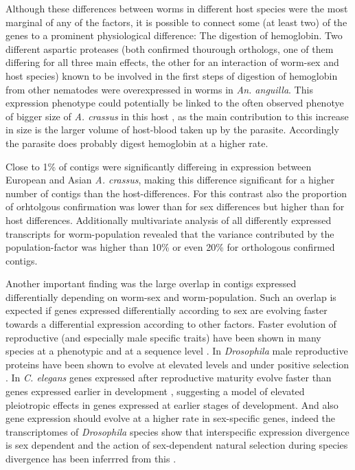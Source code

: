 Although these differences between worms in different host species
were the most marginal of any of the factors, it is possible to
connect some (at least two) of the genes to a prominent physiological
difference: The digestion of hemoglobin. Two different aspartic
proteases (both confirmed thourough orthologs, one of them differing
for all three main effects, the other for an interaction of worm-sex
and host species) known to be involved in the first steps of digestion
of hemoglobin from other nematodes \cite{pmid12782060} were
overexpressed in worms in \textit{An. anguilla}. This expression
phenotype could potentially be linked to the often observed phenotye
of bigger size of \textit{A. crassus} in this host
\cite{knopf_swimbladder_2006}, as the main contribution to this
increase in size is the larger volume of host-blood taken up by the
parasite. Accordingly the parasite does probably digest hemoglobin at
a higher rate.

Close to 1\% of contigs were significantly differeing in expression
between European and Asian \textit{A. crassus}, making this difference
significant for a higher number of contigs than the
host-differences. For this contrast also the proportion of orhtolgous
confirmation was lower than for sex differences but higher than for
host differences. Additionally multivariate analysis of all
differently expressed transcripts for worm-population revealed that
the variance contributed by the population-factor was higher than 10\%
or even 20\% for orthologous confirmed contigs.

Another important finding was the large overlap in contigs expressed
differentially depending on worm-sex and worm-population. Such an
overlap is expected if genes expressed differentially according to sex
are evolving faster towards a differential expression according to
other factors. Faster evolution of reproductive (and especially male
specific traits) have been shown in many species at a phenotypic and
at a sequence level \cite{pmid15795858}. In \textit{Drosophila} male
reproductive proteins have been shown to evolve at elevated levels and
under positive selection \cite{pmid11404480}. In \textit{C. elegans}
genes expressed after reproductive maturity evolve faster than genes
expressed earlier in development \cite{pmid15371532}, suggesting a
model of elevated pleiotropic effects in genes expressed at earlier
stages of development. And also gene expression should evolve at a
higher rate in sex-specific genes, indeed the transcriptomes of
\textit{Drosophila} species show that interspecific expression
divergence is sex dependent and the action of sex-dependent natural
selection during species divergence has been inferrred from this
\cite{pmid15034135,pmid19720861}.

